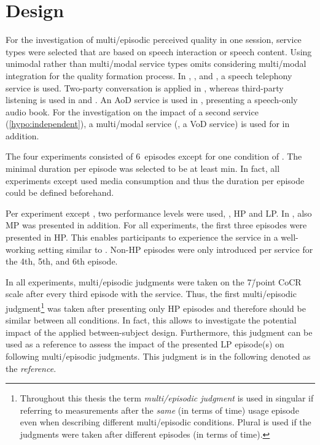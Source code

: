 \section{Design}
For the investigation of multi\-/episodic perceived quality in one session, service types were selected that are based on speech interaction or speech content.
Using unimodal rather than multi\-/modal service types omits considering multi\-/modal integration for the quality formation process.
In , \EIIa{}, and \EIIb{}, a speech telephony service is used.
Two-party conversation is applied in , whereas third-party listening is used in \EIIa{} and \EIIb{}.
An \ac{AoD} service is used in , presenting a speech-only audio book.
For the investigation on the impact of a second service (\autoref{hypo:independent}), a multi\-/modal service (\ie, a \ac{VoD} service) is used for \EIIb{} in addition.

The four experiments consisted of 6~episodes except for one condition of .
The minimal duration per episode was selected to be at least \unit[2]{min}.
In fact, all experiments except  used media consumption and thus the duration per episode could be defined beforehand.

Per experiment except , two performance levels were used, \ie, \acf{HP} and \acf{LP}.
In , also \acf{MP} was presented in addition.
For all experiments, the first three episodes were presented in \ac{HP}.
This enables participants to experience the service in a well-working setting similar to \citet[][]{moller_single-call_2011}.
Non-\ac{HP} episodes were only introduced per service for the 4th, 5th, and 6th episode.

In all experiments, multi\-/episodic judgments were taken on the 7\=/point \ac{CoCR} scale after every third episode with the service.
Thus, the first multi\-/episodic judgment\footnote{Throughout this thesis the term \emph{multi\-/episodic judgment} is used in singular if referring to measurements after the \emph{same} (in terms of time) usage episode even when describing different multi\-/episodic conditions. Plural is used if the judgments were taken after different episodes (in terms of time).} was taken after presenting only \ac{HP} episodes and therefore should be similar between all conditions.
In fact, this allows to investigate the potential impact of the applied between-subject design.
Furthermore, this judgment can be used as a reference to assess the impact of the presented \ac{LP} episode(s) on following multi\-/episodic judgments.
This judgment is in the following denoted as the \emph{reference}.

